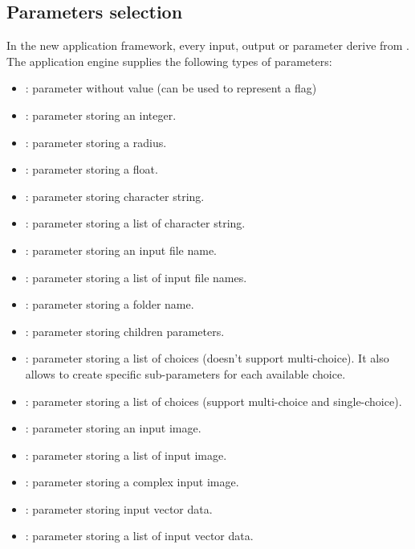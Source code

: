 \subsection{Parameters selection}
\label{sec:appParam}
In the new application framework, every input, output or parameter derive from 
. The application engine supplies the following 
types of parameters:
\begin{itemize}
  \item {} : parameter without value (can be used to represent 
  a flag)
  \item {} : parameter storing an integer.
  \item {} : parameter storing a radius.
  \item {} : parameter storing a float.
  \item {} : parameter storing character string.
  \item {} : parameter storing a list of character string.
  \item {} : parameter storing an input file name.
  \item {} : parameter storing a list of input file names.
  \item {} : parameter storing a folder name.
  \item {} : parameter storing children parameters.
  \item {} : parameter storing a list of choices (doesn't support
  multi-choice). It also allows to create specific sub-parameters for each available choice.
  \item {} : parameter storing a list of choices (support 
  multi-choice and single-choice).
  \item {} : parameter storing an input image.
  \item {} : parameter storing a list of input image.
  \item {} : parameter storing a complex input image.
  \item {} : parameter storing input vector data.
  \item {} : parameter storing a list of input vector data.

\end{itemize}
